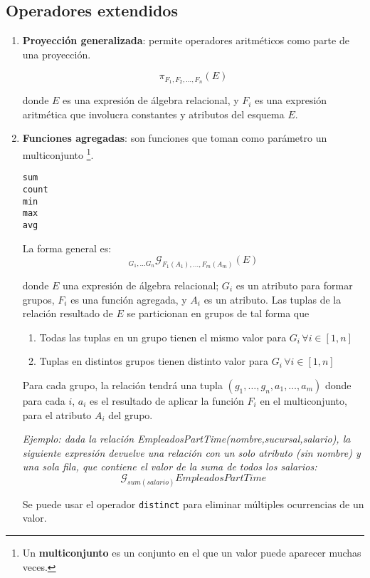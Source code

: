 \documentclass[a4paper, twoside]{article}
\begin{document}
\subsection{Operadores extendidos}
\begin{enumerate}
	\item \textbf{Proyección generalizada}: permite operadores aritméticos como parte de una proyección.

	\[
		\pi_{F_{1},F_{2},\dots,F_{n}}(E)
	\]

	donde $E$ es una expresión de álgebra relacional, y $F_{i}$ es una expresión aritmética que involucra constantes y atributos del esquema $E$.

	\item \textbf{Funciones agregadas}: son funciones que toman como parámetro un multiconjunto%
	\footnote{Un \textbf{multiconjunto} es un conjunto en el que un valor puede aparecer muchas veces.}.
	\begin{lstlisting}
sum
count
min
max
avg
	\end{lstlisting}

	La forma general es: 
	\[
		_{G_{1},\dots G_{n}}\mathcal{G}_{F_{1}(A_{1}),\dots,F_{m}(A_{m})}(E)
	\]

	donde $E$ una expresión de álgebra relacional; $G_{i}$ es un atributo para formar grupos, $F_{i}$ es una función agregada, y $A_{i}$ es un atributo. Las tuplas de la relación resultado de $E$ se particionan en grupos de tal forma que
	\begin{enumerate}
		\item Todas las tuplas en un grupo tienen el mismo valor para $G_{i}\,\forall i\in[1,n]$
		\item Tuplas en distintos grupos tienen distinto valor para $G_{i}\,\forall i\in[1,n]$
	\end{enumerate}

	Para cada grupo, la relación tendrá una tupla $(g_{1},\dots,g_{n},a_{1},\dots,a_{m})$ donde para cada $i$, $a_{i}$ es el resultado de aplicar la función $F_{i}$ en el multiconjunto, para el atributo $A_{i}$ del grupo.

	\emph{Ejemplo: dada la relación EmpleadosPartTime(nombre,sucursal,salario), la siguiente expresión devuelve una relación con un solo atributo (sin nombre) y una sola fila, que contiene el valor de la suma de todos los salarios:} 
	\[
		\mathcal{G}_{sum(salario)}EmpleadosPartTime
	\]

	Se puede usar el operador \texttt{distinct} para eliminar múltiples ocurrencias de un valor.


\end{enumerate}
\end{document}
